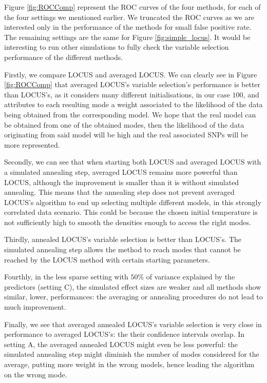 \documentclass[a4paper, 11pt]{report}
\numberwithin{equation}{chapter}
\begin{document}
Figure \ref{fig:ROCComp} represent the ROC curves of the four methods, for each of the four settings we mentioned earlier. We truncated the ROC curves as we are interested only in the performance of the methods for small false positive rate. The remaining settings are the same for Figure \ref{fig:simple_locus}. It would be interesting to run other simulations to fully check the variable selection performance of the different methods.

Firstly, we compare LOCUS and averaged LOCUS. We can clearly see in Figure \ref{fig:ROCComp} that averaged LOCUS's variable selection's performance is better than LOCUS's, as it considers many different initialisations, in our case $100$, and attributes to each resulting mode a weight associated to the likelihood of the data being obtained from the corresponding model. We hope that the real model can be obtained from one of the obtained modes, then the likelihood of the data originating from said model will be high and the real associated SNPs will be more represented.

Secondly, we can see that when starting both LOCUS and averaged LOCUS with a simulated annealing step, averaged LOCUS remains more powerful than LOCUS, although the improvement is smaller than it is without simulated annealing. This means that the annealing step does not prevent averaged LOCUS's algorithm to end up selecting multiple different models, in this strongly correlated data scenario. This could be because the chosen initial temperature is not sufficiently high to smooth the densities enough to access the right modes.

Thirdly, annealed LOCUS's variable selection is better than LOCUS's. The simulated annealing step allows the method to reach modes that cannot be reached by the LOCUS method with certain starting parameters. 

Fourthly, in the less sparse setting with $50\%$ of variance explained by the predictors (setting C), the simulated effect sizes are weaker and all methods show similar, lower, performances: the averaging or annealing procedures do not lead to much improvement.

Finally, we see that averaged annealed LOCUS's variable selection is very close in performance to averaged LOCUS's: the their confidence intervals overlap. In setting A, the averaged annealed LOCUS might even be less powerful: the simulated annealing step might diminish the number of modes considered for the average, putting more weight in the wrong models, hence leading the algorithm on the wrong mode.
\end{document}
